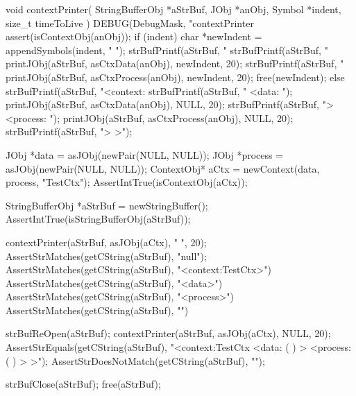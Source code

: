 \startCCode
void contextPrinter(
  StringBufferObj *aStrBuf,
  JObj            *anObj,
  Symbol          *indent,
  size_t           timeToLive
) {
  DEBUG(DebugMask, "contextPrinter %
  assert(isContextObj(anObj));
  if (indent) {
    char *newIndent = appendSymbols(indent, "    ");
    strBufPrintf(aStrBuf, "%
    strBufPrintf(aStrBuf, "%
    printJObj(aStrBuf, asCtxData(anObj), newIndent, 20);
    strBufPrintf(aStrBuf, "%
    printJObj(aStrBuf, asCtxProcess(anObj), newIndent, 20);
    free(newIndent);
  } else {
    strBufPrintf(aStrBuf, "<context:%
    strBufPrintf(aStrBuf, "  <data: ");
    printJObj(aStrBuf, asCtxData(anObj), NULL, 20);
    strBufPrintf(aStrBuf, "> <process: ");
    printJObj(aStrBuf, asCtxProcess(anObj), NULL, 20);
    strBufPrintf(aStrBuf, "> >");
  }
}
\stopCCode


\startCTest
  JObj *data       = asJObj(newPair(NULL, NULL));
  JObj *process    = asJObj(newPair(NULL, NULL));
  ContextObj* aCtx = newContext(data, process, "TestCtx");
  AssertIntTrue(isContextObj(aCtx));
  
  StringBufferObj *aStrBuf = newStringBuffer();
  AssertIntTrue(isStringBufferObj(aStrBuf));
  
  contextPrinter(aStrBuf, asJObj(aCtx), "  ", 20);
  AssertStrMatches(getCString(aStrBuf), "null");
  AssertStrMatches(getCString(aStrBuf), "<context:TestCtx>")
  AssertStrMatches(getCString(aStrBuf), "<data>")
  AssertStrMatches(getCString(aStrBuf), "<process>")
  AssertStrMatches(getCString(aStrBuf), "\n")

  strBufReOpen(aStrBuf);
  contextPrinter(aStrBuf, asJObj(aCtx), NULL, 20);
  AssertStrEquals(getCString(aStrBuf), "<context:TestCtx   <data: (  )  > <process: (  )  > >");
  AssertStrDoesNotMatch(getCString(aStrBuf), "\n");
  
  strBufClose(aStrBuf);
  free(aStrBuf);
\stopCTest
\stopTestCase
\stopTestSuite
